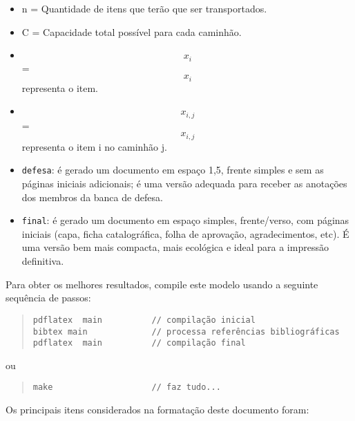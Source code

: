 \begin{itemize}
  \item n = Quantidade de itens que terão que ser transportados.
  \item C = Capacidade total possível para cada caminhão.
  \item {\[ x_{i} \] = \[x_{i}\] representa o item.}
  \item \[ x_{i,j}\] = \[x_{i,j}\] representa o item i no caminhão j.
\end{itemize}


\begin{itemize}

\item \verb#defesa#: é gerado um documento em espaço 1,5, frente simples e sem as páginas iniciais adicionais; é uma versão adequada para receber as anotações dos membros da banca de defesa.

\item \verb#final#: é gerado um documento em espaço simples, frente/verso, com páginas iniciais (capa, ficha catalográfica, folha de aprovação, agradecimentos, etc). É uma versão bem mais compacta, mais ecológica e ideal para a impressão definitiva.

\end{itemize}

Para obter os melhores resultados, compile este modelo usando a seguinte sequência de passos:

\begin{quote}
\begin{footnotesize}
\begin{verbatim}
pdflatex  main          // compilação inicial
bibtex main             // processa referências bibliográficas
pdflatex  main          // compilação final
\end{verbatim}
\end{footnotesize}
\end{quote}

ou

\begin{quote}
\begin{footnotesize}
\begin{verbatim}
make                    // faz tudo...
\end{verbatim}
\end{footnotesize}
\end{quote}

Os principais itens considerados na formatação deste documento foram:

